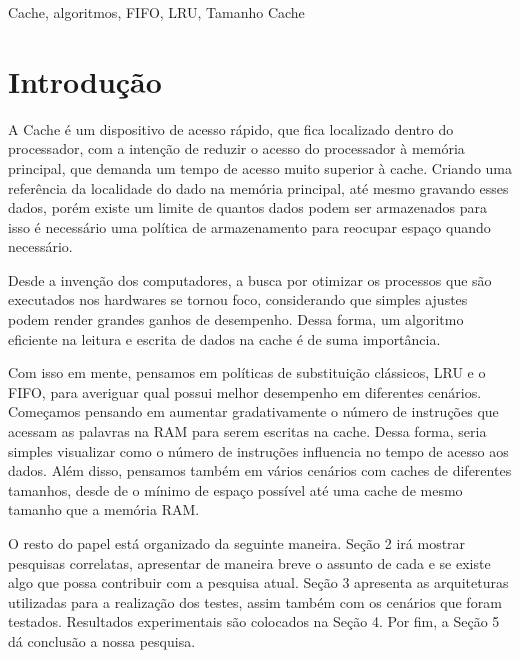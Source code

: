 \documentclass[conference]{IEEEtran}
\begin{document}
\begin{IEEEkeywords}
Cache, algoritmos, FIFO, LRU, Tamanho Cache
\end{IEEEkeywords}

\section{Introdução}


A Cache é um dispositivo de acesso rápido, que fica localizado dentro do processador,
com a intenção de reduzir o acesso do processador à memória principal, que demanda um
tempo de acesso muito superior à cache. Criando uma referência da localidade do dado na 
memória principal, até mesmo gravando esses dados, porém existe um limite de quantos 
dados podem ser armazenados para isso é necessário uma política de armazenamento para 
reocupar espaço quando necessário.

Desde a invenção dos computadores, a busca por otimizar os processos que são executados 
nos hardwares se tornou foco, considerando que simples ajustes podem render grandes 
ganhos de desempenho. Dessa forma, um algoritmo eficiente na leitura e escrita de 
dados na cache é de suma importância. 

Com isso em mente, pensamos em políticas de substituição clássicos, LRU e o FIFO, para
averiguar qual possui melhor desempenho em diferentes cenários. Começamos pensando em 
aumentar gradativamente o número de instruções que acessam as palavras na RAM para serem 
escritas na cache. Dessa forma, seria simples visualizar como o número de instruções
influencia no tempo de acesso aos dados. Além disso, pensamos também em vários cenários 
com caches de diferentes tamanhos, desde de o mínimo de espaço possível até uma cache 
de mesmo tamanho que a memória RAM.

O resto do papel está organizado da seguinte maneira. Seção 2 irá mostrar pesquisas correlatas,
apresentar de maneira breve o assunto de cada e se existe algo que possa contribuir com a pesquisa atual.
Seção 3 apresenta as arquiteturas utilizadas para a realização dos testes, assim também com os cenários 
que foram testados. Resultados experimentais são colocados na Seção 4. Por fim, a Seção 5 dá conclusão 
a nossa pesquisa.
\end{document}
